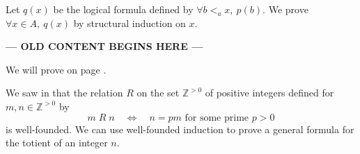 \begin{cproof}
Let $q(x)$ be the logical formula defined by $\forall b <_a x,~ p(b)$. We prove $\forall x \in A,~ q(x)$ by structural induction on $x$.
\end{cproof}


\textbf{--- OLD CONTENT BEGINS HERE ---}

We will prove  on page \pageref{prfStructuralInduction}.

\begin{example}
\label{exStructuralInductoinOnNIsWeakInduction}
\end{example}



We saw in  that the relation $R$ on the set $\mathbb{Z}^{>0}$ of positive integers defined for $m,n \in \mathbb{Z}^{>0}$ by
\[ m\; R\; n \quad \Leftrightarrow \quad n=pm \text{ for some prime } p>0 \]
is well-founded. We can use well-founded induction to prove a general formula for the totient of an integer $n$.


